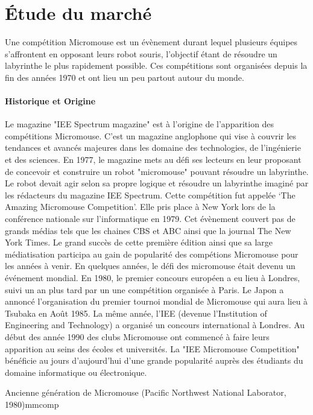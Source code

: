 \section{Étude du marché} \label{sec:etudeMarche}
Une compétition Micromouse est un évènement durant lequel plusieurs équipes
s'affrontent en opposant leurs robot souris, l'objectif étant de résoudre un
labyrinthe le plus rapidement possible.  Ces compétitions sont organisées
depuis la fin des années 1970 et ont lieu un peu partout autour du monde.

\paragraph{Historique et Origine}
Le magazine "IEE Spectrum magazine" est à l'origine de l'apparition des
compétitions Micromouse. C'est un magazine anglophone qui vise à couvrir les
tendances et avancés majeures dans les domaine des technologies, de
l'ingénierie et des sciences. En 1977, le magazine mets au défi ses lecteurs en
leur proposant de concevoir et construire un robot "micromouse" pouvant
résoudre un labyrinthe. Le robot devait agir selon sa propre logique et
résoudre un labyrinthe imaginé par les rédacteurs du magazine IEE Spectrum.
Cette compétition fut appelée ‘The Amazing Micromouse Competition’. Elle pris
place à New York lors de la conférence nationale sur l'informatique en 1979.
Cet évènement couvert pas de grands médias tels que les chaines CBS et ABC
ainsi que la journal The New York Times.  Le grand succès de cette première
édition ainsi que sa large médiatisation participa au gain de popularité des
compétions Micromouse pour les années à venir.  En quelques années, le défi des
micromouse était devenu un événement mondial. En 1980, le premier concours
européen a eu lieu à Londres, suivi un an plus tard par un une compétition
organisée à Paris. Le Japon a annoncé l'organisation du premier tournoi mondial
de Micromouse qui aura lieu à Tsubaka en Août 1985. La même année, l'IEE
(devenue l'Institution of Engineering and Technology) a organisé un concours
international à Londres.  Au début des année 1990 des clubs Micromouse ont
commencé à faire leurs apparition au seins des écoles et universités. La "IEE
Micromouse Competition" bénéficie au jours d'aujourd'hui d'une grande
popularité auprès des étudiants du domaine informatique ou électronique.
\newpage
    
{Ancienne génération de Micromouse (Pacific Northwest National Laborator, 1980)}{mmcomp}

